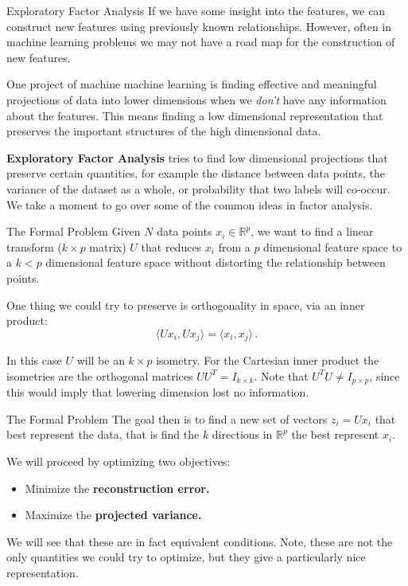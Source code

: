 \documentclass[10pt, table, dvipsnames,xcdraw,handout]{beamer}
\newcommand{\bR}{\ensuremath{\mathbb{R}}}
\begin{document}
\begin{frame}[fragile]{Exploratory Factor Analysis}
If we have some insight into the features, we can construct new features using previously known relationships. However, often in machine learning problems we may not have a road map  for the construction of new features.

One project of machine machine learning is finding effective and meaningful projections of data into lower dimensions when we \emph{don't} have any information about the features. This means finding a low dimensional representation that preserves the important structures of the high dimensional data. 

\textbf{Exploratory Factor Analysis} tries to find low dimensional projections that preserve certain quantities, for example the distance between data points, the variance of the dataset as a whole, or probability that two labels will co-occur. We take a moment to go over some of the common ideas in factor analysis. 
\end{frame}


\begin{frame}[fragile]{The Formal Problem}
Given $N$ data points $x_i\in \bR^p$, we want to find a linear transform ($k\times p$ matrix) $U$ that reduces $x_i$ from a $p$ dimensional feature space to a $k<p$ dimensional feature space without distorting the relationship between points. \pause

One thing we could try to preserve is orthogonality in space, via an inner product: 
$$
\langle Ux_i,Ux_j\rangle = \langle x_i,x_j\rangle\,.
$$ \pause

In this case $U$ will be an $k\times p$ isometry. For the Cartesian inner product the isometries are the orthogonal matrices $UU^T =  I_{k\times k}$. Note that $U^TU\neq I_{p\times p}$, since this would imply that lowering dimension lost no information. 
\end{frame}



\begin{frame}[fragile]{The Formal Problem}
The goal then is to find a new set of vectors $z_i = Ux_i$ that best represent the data, that is find the $k$ directions in $\bR^p$ the best represent $x_i$. \pause

We will proceed by optimizing two objectives:\pause

\begin{itemize}
\item[] Minimize the \textbf{reconstruction error.}\pause
\item[] Maximize the \textbf{projected variance.}\pause
\end{itemize}
We will see that these are in fact equivalent conditions. Note, these are not the only quantities we could try to optimize,  but they give a particularly nice representation.
\end{frame}
\end{document}
